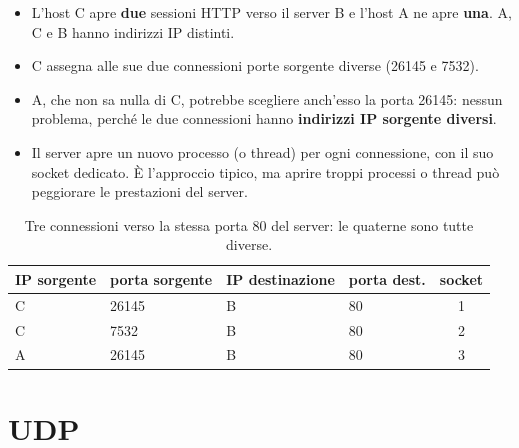 \begin{itemize}
    \item L'host C apre \textbf{due} sessioni HTTP verso il server B e l'host A ne apre \textbf{una}. A, C e B hanno
          indirizzi IP distinti.
    \item C assegna alle sue due connessioni porte sorgente diverse (26145 e 7532).
    \item A, che non sa nulla di C, potrebbe scegliere anch'esso la porta 26145: nessun problema, perché le due
          connessioni hanno \textbf{indirizzi IP sorgente diversi}.
    \item Il server apre un nuovo processo (o thread) per ogni connessione, con il suo socket dedicato. È
          l'approccio tipico, ma aprire troppi processi o thread può peggiorare le prestazioni del server.
\end{itemize}

\begin{table}[H]
\centering
\begin{tabular}{llllc}
\toprule
\textbf{IP sorgente} & \textbf{porta sorgente} & \textbf{IP destinazione} & \textbf{porta dest.} & \textbf{socket} \\
\midrule
C & 26145 & B & 80 & 1 \\
C & 7532 & B & 80 & 2 \\
A & 26145 & B & 80 & 3 \\
\bottomrule
\end{tabular}
\caption{Tre connessioni verso la stessa porta 80 del server: le quaterne sono tutte diverse.}
\end{table}

\section{UDP}


